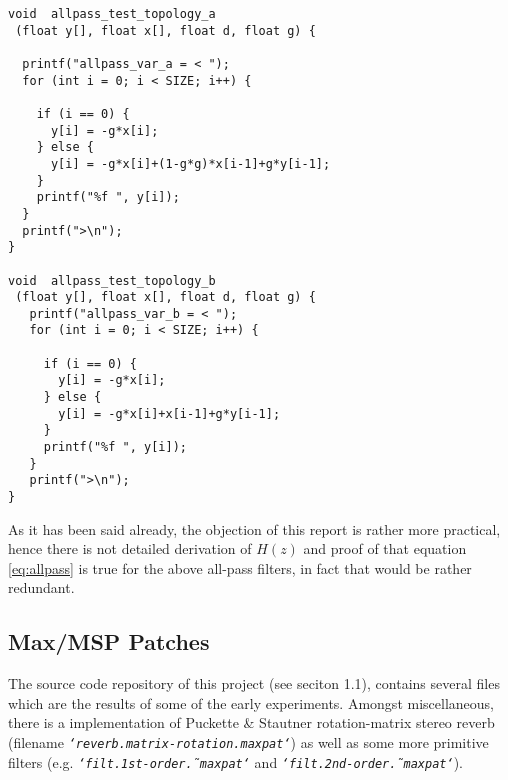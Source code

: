 \documentclass[12pt]{report}
\begin{document}
\begin{lstlisting}
void  allpass_test_topology_a
 (float y[], float x[], float d, float g) {

  printf("allpass_var_a = < ");
  for (int i = 0; i < SIZE; i++) {
  
    if (i == 0) { 
      y[i] = -g*x[i];
    } else {
      y[i] = -g*x[i]+(1-g*g)*x[i-1]+g*y[i-1];
    }
    printf("%f ", y[i]);
  }
  printf(">\n");
}

void  allpass_test_topology_b
 (float y[], float x[], float d, float g) {
   printf("allpass_var_b = < ");
   for (int i = 0; i < SIZE; i++) {

     if (i == 0) { 
       y[i] = -g*x[i];
     } else {
       y[i] = -g*x[i]+x[i-1]+g*y[i-1];
     }
     printf("%f ", y[i]);
   }
   printf(">\n");
}
\end{lstlisting}
\vspace{2em}
As it has been said already, the objection of this report is rather more
practical, hence there is not detailed derivation of $H(z)$ and proof of
that equation \ref{eq:allpass} is true for the above all-pass filters,
in fact that would be rather redundant.

\subsection{Max/MSP Patches}

The source code repository of this project (see seciton 1.1), contains
several files which are the results of some of the early experiments.
Amongst miscellaneous, there is a implementation of Puckette \& Stautner
rotation-matrix stereo reverb (filename \emph{\texttt{`reverb.matrix-rotation.maxpat`}})
as well as some more primitive filters (e.g. \emph{\texttt{`filt.1st-order\~.maxpat`}} and
\emph{\texttt{`filt.2nd-order\~.maxpat`}}).

  




%
%


\end{document}
